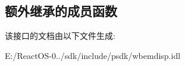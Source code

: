 \subsection*{额外继承的成员函数}


该接口的文档由以下文件生成\+:\begin{DoxyCompactItemize}
\item 
E\+:/\+React\+O\+S-\/0../sdk/include/psdk/wbemdisp.\+idl\end{DoxyCompactItemize}
